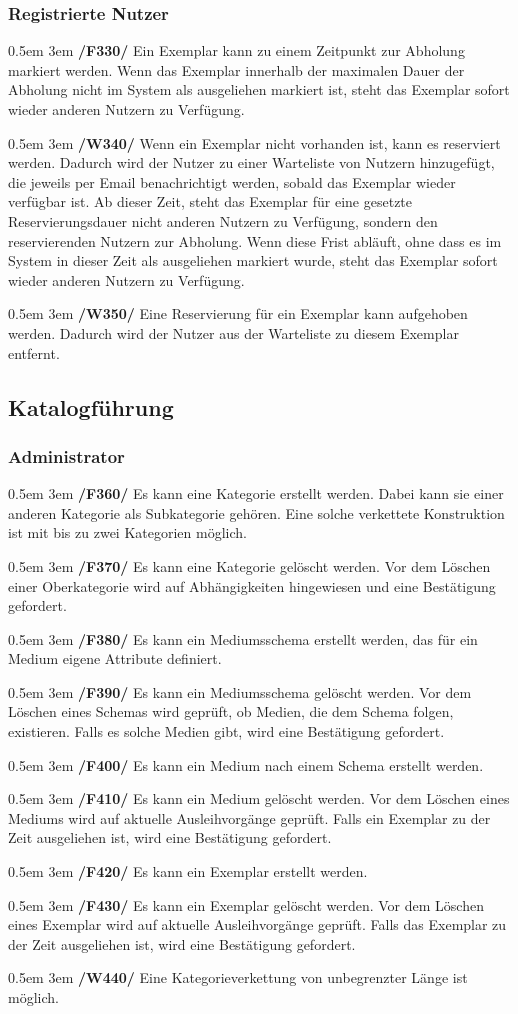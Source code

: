 \documentclass{article}
\newcommand{\specification}[3]{
	{\parindent 0.5em \hangindent 3em \hypertarget{spec:#1:#2}{\textbf{/#1#2/}} #3 \par \nobreak \vspace*{0.5em}}
}
\begin{document}
		\subsubsection{Registrierte Nutzer}
			\specification{F}{330}{Ein Exemplar kann zu einem Zeitpunkt zur Abholung markiert werden.
				Wenn das Exemplar innerhalb der maximalen Dauer der Abholung nicht im System als ausgeliehen markiert ist, steht das Exemplar sofort wieder anderen Nutzern zu Verfügung. }
			\specification{W}{340}{Wenn ein Exemplar nicht vorhanden ist, kann es reserviert werden.
				Dadurch wird der Nutzer zu einer Warteliste von Nutzern hinzugefügt, die jeweils per Email benachrichtigt werden, sobald das Exemplar wieder verfügbar ist.
				Ab dieser Zeit, steht das Exemplar für eine gesetzte Reservierungsdauer nicht anderen Nutzern zu Verfügung, sondern den reservierenden Nutzern zur Abholung.
				Wenn diese Frist abläuft, ohne dass es im System in dieser Zeit als ausgeliehen markiert wurde, steht das Exemplar sofort wieder anderen Nutzern zu Verfügung. }
			\specification{W}{350}{Eine Reservierung für ein Exemplar kann aufgehoben werden. Dadurch wird der Nutzer aus der Warteliste zu diesem Exemplar entfernt. }
	\subsection{Katalogführung}
		\subsubsection{Administrator}
			\specification{F}{360}{Es kann eine Kategorie erstellt werden. Dabei kann sie einer anderen Kategorie als Subkategorie gehören.
				Eine solche verkettete Konstruktion ist mit bis zu zwei Kategorien möglich. }
			\specification{F}{370}{Es kann eine Kategorie gelöscht werden. Vor dem Löschen einer Oberkategorie wird auf Abhängigkeiten hingewiesen und eine Bestätigung gefordert. }
			\specification{F}{380}{Es kann ein Mediumsschema erstellt werden, das für ein Medium eigene Attribute definiert. }
			\specification{F}{390}{Es kann ein Mediumsschema gelöscht werden. Vor dem Löschen eines Schemas wird geprüft, ob Medien, die dem Schema folgen, existieren.
				Falls es solche Medien gibt, wird eine Bestätigung gefordert. }
			\specification{F}{400}{Es kann ein Medium nach einem Schema erstellt werden. }
			\specification{F}{410}{Es kann ein Medium gelöscht werden. Vor dem Löschen eines Mediums wird auf aktuelle Ausleihvorgänge geprüft.
				Falls ein Exemplar zu der Zeit ausgeliehen ist, wird eine Bestätigung gefordert. }
			\specification{F}{420}{Es kann ein Exemplar erstellt werden. }
			\specification{F}{430}{Es kann ein Exemplar gelöscht werden. Vor dem Löschen eines Exemplar wird auf aktuelle Ausleihvorgänge geprüft.
				Falls das Exemplar zu der Zeit ausgeliehen ist, wird eine Bestätigung gefordert.  }
			\specification{W}{440}{Eine Kategorieverkettung von unbegrenzter Länge ist möglich. }
\end{document}
